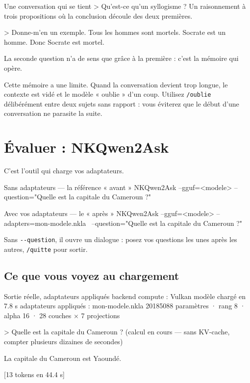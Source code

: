 \begin{nkcode}[]{Une conversation qui se tient}
> Qu'est-ce qu'un syllogisme ?
  Un raisonnement à trois propositions où la conclusion découle des deux
  premières.

> Donne-m'en un exemple.
  Tous les hommes sont mortels. Socrate est un homme. Donc Socrate est mortel.
\end{nkcode}

La seconde question n'a de sens que grâce à la première : c'est la mémoire qui
opère.

\begin{nkpiege}
Cette mémoire a une limite. Quand la conversation devient trop longue, le
contexte est vidé et le modèle « oublie » d'un coup. Utilisez \texttt{/oublie}
délibérément entre deux sujets sans rapport : vous éviterez que le début d'une
conversation ne parasite la suite.
\end{nkpiege}

\section{Évaluer : NKQwen2Ask}

C'est l'outil qui charge vos adaptateurs.

\begin{nkcode}[]{Sans adaptateurs — la référence « avant »}
NKQwen2Ask --gguf=<modele> --question="Quelle est la capitale du Cameroun ?"
\end{nkcode}

\begin{nkcode}[]{Avec vos adaptateurs — le « après »}
NKQwen2Ask --gguf=<modele> --adapters=mon-modele.nkla \
           --question="Quelle est la capitale du Cameroun ?"
\end{nkcode}

Sans \texttt{-{}-question}, il ouvre un dialogue : posez vos questions les unes
après les autres, \texttt{/quitte} pour sortir.

\subsection{Ce que vous voyez au chargement}

\begin{nkcode}[]{Sortie réelle, adaptateurs appliqués}
backend compute : Vulkan
modèle chargé en 7.8 s
adaptateurs appliqués : mon-modele.nkla
  20185088 paramètres · rang 8 · alpha 16 · 28 couches × 7 projections

  > Quelle est la capitale du Cameroun ?
  (calcul en cours — sans KV-cache, compter plusieurs dizaines de secondes)

  La capitale du Cameroun est Yaoundé.

  [13 tokens en 44.4 s]
\end{nkcode}

